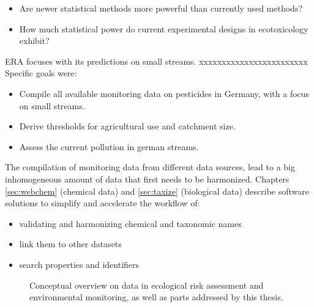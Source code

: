 \begin{itemize}
	\item Are newer statistical methods more powerful than currently used methods?
	\item How much statistical power do current experimental designs in ecotoxicology exhibit?
\end{itemize}

\noindent
ERA focuses with its predictions on small streams. 
 xxxxxxxxxxxxxxxxxxxxxxxx
Specific goals were:
\begin{itemize}
	\item Compile all available monitoring data on pesticides in Germany, with a focus on small streams.
	\item Derive thresholds for agricultural use and catchment size.
	\item Assess the current pollution in german streams.
\end{itemize}



\noindent
The compilation of monitoring data from different data sources, lead to a big inhomogeneous amount of data that first needs to be harmonized.
Chapters \ref{sec:webchem} (chemical data) and \ref{sec:taxize} (biological data) describe software solutions to simplify and accelerate the workflow of:

\begin{itemize}
	\item validating and harmonizing chemical and taxonomic names
	\item link them to other datasets
	\item search properties and identifiers
\end{itemize}


\begin{figure}[h]
	\centering
	\resizebox{\textwidth}{!}{%
		
	}
	\caption[Conceptual overview of the topics addressed by this thesis]{Conceptual overview on data in ecological risk assessment and environmental monitoring, as well as parts addressed by this thesis.}
	\label{fig:intro:overview}
\end{figure}
